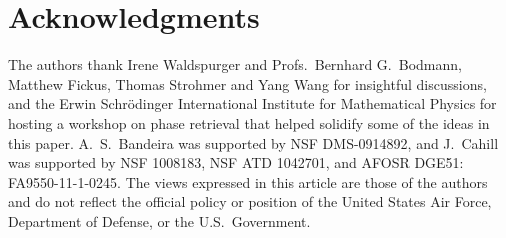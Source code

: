 \documentclass[times,10pt]{elsarticle}
\theoremstyle{plain}
\begin{document}
\section*{Acknowledgments}
The authors thank Irene Waldspurger and Profs.\ Bernhard G.\ Bodmann, Matthew Fickus, Thomas Strohmer and Yang Wang for insightful discussions, and the Erwin Schr\"{o}dinger International Institute for Mathematical Physics for hosting a workshop on phase retrieval that helped solidify some of the ideas in this paper.
A.\ S.\ Bandeira was supported by NSF DMS-0914892, and J.\ Cahill was supported by NSF 1008183, NSF ATD 1042701, and AFOSR DGE51: FA9550-11-1-0245.
The views expressed in this article are those of the authors and do not reflect the official policy or position of the United States Air Force, Department of Defense, or the U.S.~Government.
\end{document}
